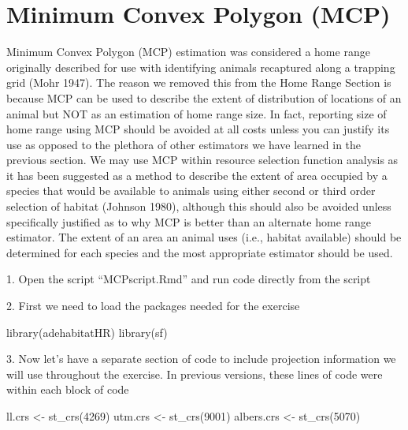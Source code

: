 \documentclass[
  letterpaper,
]{book}
\newenvironment{Shaded}{\begin{snugshade}}{\end{snugshade}}
\newcommand{\DecValTok}[1]{\textcolor[rgb]{0.68,0.00,0.00}{#1}}
\newcommand{\FunctionTok}[1]{\textcolor[rgb]{0.28,0.35,0.67}{#1}}
\newcommand{\NormalTok}[1]{\textcolor[rgb]{0.00,0.23,0.31}{#1}}
\newcommand{\OtherTok}[1]{\textcolor[rgb]{0.00,0.23,0.31}{#1}}
\begin{document}
\hypertarget{minimum-convex-polygon-mcp}{%
\section{Minimum Convex Polygon
(MCP)}\label{minimum-convex-polygon-mcp}}

Minimum Convex Polygon (MCP) estimation was considered a home range
originally described for use with identifying animals recaptured along a
trapping grid (Mohr 1947). The reason we removed this from the Home
Range Section is because MCP can be used to describe the extent of
distribution of locations of an animal but NOT as an estimation of home
range size. In fact, reporting size of home range using MCP should be
avoided at all costs unless you can justify its use as opposed to the
plethora of other estimators we have learned in the previous section. We
may use MCP within resource selection function analysis as it has been
suggested as a method to describe the extent of area occupied by a
species that would be available to animals using either second or third
order selection of habitat (Johnson 1980), although this should also be
avoided unless specifically justified as to why MCP is better than an
alternate home range estimator. The extent of an area an animal uses
(i.e., habitat available) should be determined for each species and the
most appropriate estimator should be used.

1. Open the script ``MCPscript.Rmd'' and run code directly from the
script

2. First we need to load the packages needed for the exercise

\begin{Shaded}
\begin{Highlighting}[]
\FunctionTok{library}\NormalTok{(adehabitatHR)}
\FunctionTok{library}\NormalTok{(sf)}
\end{Highlighting}
\end{Shaded}

3. Now let's have a separate section of code to include projection
information we will use throughout the exercise. In previous versions,
these lines of code were within each block of code

\begin{Shaded}
\begin{Highlighting}[]
\NormalTok{ll.crs }\OtherTok{\textless{}{-}} \FunctionTok{st\_crs}\NormalTok{(}\DecValTok{4269}\NormalTok{) }
\NormalTok{utm.crs }\OtherTok{\textless{}{-}} \FunctionTok{st\_crs}\NormalTok{(}\DecValTok{9001}\NormalTok{)}
\NormalTok{albers.crs }\OtherTok{\textless{}{-}} \FunctionTok{st\_crs}\NormalTok{(}\DecValTok{5070}\NormalTok{)}
\end{Highlighting}
\end{Shaded}
\end{document}
